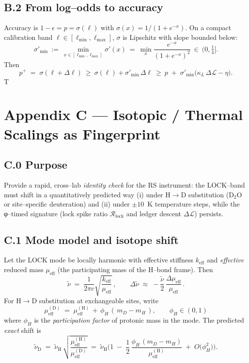 \documentclass[11pt]{article}
\begin{document}
\subsection*{B.2 From log–odds to accuracy}
Accuracy is $1-\epsilon = p = \sigma(\ell)$ with $\sigma(x)=1/(1+e^{-x})$. On a compact calibration band $\ell\in[\ell_{\min},\ell_{\max}]$, $\sigma$ is Lipschitz with slope bounded below:
\[
\sigma'_{\min}\ :=\ \min_{x\in[\ell_{\min},\ell_{\max}]}\sigma'(x)\ =\ \min_{x}\frac{e^{-x}}{(1+e^{-x})^2}\ \in\ \Big(0,\tfrac14\Big].
\]
Then
\[
p^+\;=\;\sigma(\ell+\Delta \ell)\ \ge\ \sigma(\ell)+\sigma'_{\min}\,\Delta \ell\ \ge\ p\;+\;\sigma'_{\min}\big(\kappa_L\,\Delta\mathcal{L}-\eta\big).
\]
T

\section*{Appendix C — Isotopic / Thermal Scalings as Fingerprint}\label{app:isotope-thermal}

\subsection*{C.0 Purpose}
Provide a rapid, cross–lab \emph{identity check} for the RS instrument: the \textsf{LOCK}–band must shift in a quantitatively predicted way (i) under H$\!\to\!$D substitution (D$_2$O or site–specific deuteration) and (ii) under $\pm 10$~K temperature steps, while the φ–timed signature (lock spike ratio $\mathcal{R}_{\mathrm{lock}}$ and ledger descent $\Delta\mathcal{L}$) persists.

\subsection*{C.1 Mode model and isotope shift}
Let the \textsf{LOCK} mode be locally harmonic with effective stiffness $k_{\mathrm{eff}}$ and \emph{effective} reduced mass $\mu_{\mathrm{eff}}$ (the participating mass of the H–bond frame). Then
\[
\tilde\nu \;=\; \frac{1}{2\pi c}\sqrt{\frac{k_{\mathrm{eff}}}{\mu_{\mathrm{eff}}}}\,,\qquad
\Delta\tilde\nu\;\approx\;-\frac{\tilde\nu}{2}\,\frac{\Delta \mu_{\mathrm{eff}}}{\mu_{\mathrm{eff}}}\,.
\]
For H$\!\to\!$D substitution at exchangeable sites, write
\[
\mu_{\mathrm{eff}}^{\mathrm{(D)}} \;=\; \mu_{\mathrm{eff}}^{\mathrm{(H)}}\,+\,\phi_H\,(\,m_D-m_H\,),\qquad \phi_H\in(0,1)
\]
where $\phi_H$ is the \emph{participation factor} of protonic mass in the mode. The predicted \emph{exact} shift is
\begin{equation}\label{eq:isotope-shift}
\tilde\nu_{\mathrm{D}} \;=\; \tilde\nu_{\mathrm{H}}\,\sqrt{\frac{\mu_{\mathrm{eff}}^{\mathrm{(H)}}}{\mu_{\mathrm{eff}}^{\mathrm{(D)}}}}
\;=\; \tilde\nu_{\mathrm{H}}\Bigg(1 \;-\; \frac{1}{2}\,\frac{\phi_H\,(m_D-m_H)}{\mu_{\mathrm{eff}}^{\mathrm{(H)}}}\;+\;O\!\big(\phi_H^2\big)\Bigg).
\end{equation}
\end{document}
